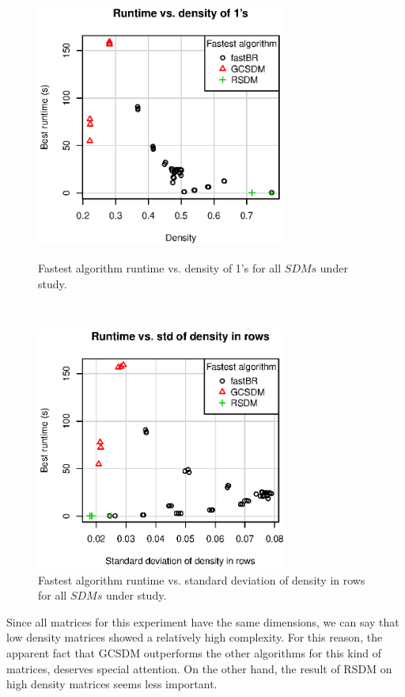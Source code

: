 \documentclass[authoryear,11pt]{elsarticle}
\begin{document}
	\begin{figure}[htb]
	\begin{minipage}{.48\textwidth}
	    \begin{center}
	       \includegraphics[height=8cm]{scatter_density.eps}
	    \end{center}
	\caption{Fastest algorithm runtime vs. density of 1's for all $SDMs$ under study.}
	\label{fig:scattDensity}
	\end{minipage}%
	~
	\begin{minipage}{.48\textwidth}
	    \begin{center}
	       \includegraphics[height=8cm]{scatter_std.eps}
	    \end{center}
	\caption{Fastest algorithm runtime vs. standard deviation of density in rows for 
			 all $SDMs$ under study.}
	\label{fig:scattStd}
	\end{minipage}	
	\end{figure}	
	
	Since all matrices for this experiment have the same dimensions, we can say that low density
	matrices showed a relatively high complexity. For this reason, the apparent fact that GCSDM outperforms 
	the other algorithms for this kind of matrices, deserves special attention. On the other hand, the result 
	of RSDM on high density matrices seems less important. 
	
\end{document}

